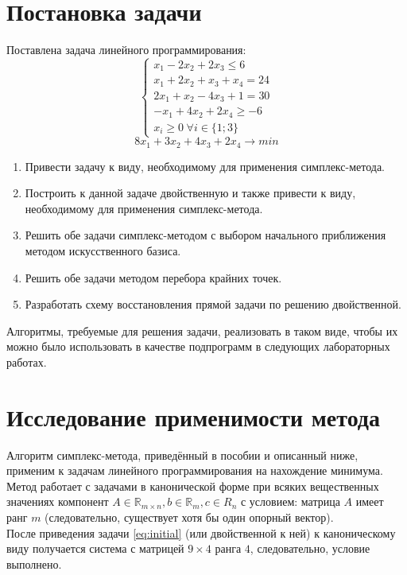\documentclass[main.tex]{subfiles}
\begin{document}
\section{Постановка задачи}
Поставлена задача линейного программирования:
\begin{equation}\label{eq:initial}
\left\{
\begin{array}{ll} 
x_1-2x_2+2x_3 \le 6\\
x_1+2x_2+x_3+x_4=24\\
2x_1+x_2-4x_3+1=30\\
-x_1+4x_2+2x_4 \ge -6\\
x_i \ge 0 \hspace{3pt} \forall i \in \{1;3\}
\end{array}
\right.
\end{equation}
$$ 8x_1 + 3x_2 + 4x_3 + 2x_4 \longrightarrow min $$
\begin{enumerate}
\item Привести задачу к виду, необходимому для применения симплекс-метода.
\item Построить к данной задаче двойственную и также привести к виду, необходимому для применения симплекс-метода.
\item Решить обе задачи симплекс-методом с выбором начального приближения методом искусственного базиса.
\item Решить обе задачи методом перебора крайних точек.
\item Разработать схему восстановления прямой задачи по решению двойственной.
\end{enumerate}
Алгоритмы, требуемые для решения задачи, реализовать в таком виде, чтобы их можно было использовать в качестве подпрограмм в следующих лабораторных работах.
\section{Исследование применимости метода}
Алгоритм симплекс-метода, приведённый в пособии \cite{petuh} и описанный ниже, применим к задачам линейного программирования на нахождение минимума. Метод работает с задачами в канонической форме при всяких вещественных значениях компонент $A \in \mathds{R}_{m\times n}, b \in \mathds{R}_m, c \in R_n$ с условием: матрица $A$ имеет ранг $m$ (следовательно, существует хотя бы один опорный вектор).\\
После приведения задачи \ref{eq:initial} (или двойственной к ней) к каноническому виду получается система с матрицей $ 9 \times 4 $ ранга $4$, следовательно, условие выполнено.\\
\end{document}
